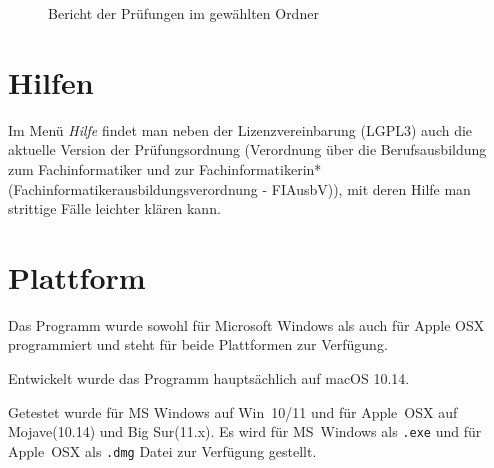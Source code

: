 \documentclass[a4paper,notitlepage,parskip=half]{scrartcl}
\begin{document}
\begin{figure}[ht]
  \centering
  \caption{Bericht der Prüfungen im gewählten Ordner}
  \label{fig:bericht}
\end{figure}

\section{Hilfen}
Im Menü \emph{Hilfe} findet man neben der Lizenzvereinbarung (LGPL3) auch die aktuelle Version der Prüfungsordnung
(Verordnung über die Berufsausbildung zum Fachinformatiker und zur Fachinformatikerin* (Fachinformatikerausbildungsverordnung - FIAusbV)), mit deren Hilfe man strittige Fälle leichter klären kann.

\section{Plattform}
Das Programm wurde sowohl für Microsoft Windows als auch für Apple OSX programmiert und steht für beide Plattformen zur Verfügung. 

Entwickelt wurde das Programm hauptsächlich auf macOS 10.14.

Getestet  wurde für MS Windows auf Win~10/11 und für Apple~OSX auf Mojave(10.14) und Big Sur(11.x).
Es wird für MS~Windows als \texttt{.exe} und für Apple~OSX als \texttt{.dmg} Datei zur Verfügung gestellt. 
\end{document}
